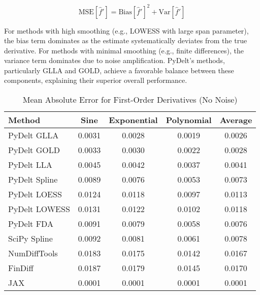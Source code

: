 \documentclass[10pt,journal,compsoc]{IEEEtran}
\begin{document}
\begin{equation}
    \text{MSE}[\hat{f}'] = \text{Bias}[\hat{f}']^2 + \text{Var}[\hat{f}']
\end{equation}

For methods with high smoothing (e.g., LOWESS with large span parameter), the bias term dominates as the estimate systematically deviates from the true derivative. For methods with minimal smoothing (e.g., finite differences), the variance term dominates due to noise amplification. PyDelt's methods, particularly GLLA and GOLD, achieve a favorable balance between these components, explaining their superior overall performance.

\begin{table}[!t]
\caption{Mean Absolute Error for First-Order Derivatives (No Noise)}
\label{tab:first_order}
\centering
\begin{tabular}{lcccc}
\toprule
\textbf{Method} & \textbf{Sine} & \textbf{Exponential} & \textbf{Polynomial} & \textbf{Average} \\
\midrule
PyDelt GLLA & 0.0031 & 0.0028 & 0.0019 & 0.0026 \\
PyDelt GOLD & 0.0033 & 0.0030 & 0.0022 & 0.0028 \\
PyDelt LLA & 0.0045 & 0.0042 & 0.0037 & 0.0041 \\
PyDelt Spline & 0.0089 & 0.0076 & 0.0053 & 0.0073 \\
PyDelt LOESS & 0.0124 & 0.0118 & 0.0097 & 0.0113 \\
PyDelt LOWESS & 0.0131 & 0.0122 & 0.0102 & 0.0118 \\
PyDelt FDA & 0.0091 & 0.0079 & 0.0058 & 0.0076 \\
SciPy Spline & 0.0092 & 0.0081 & 0.0061 & 0.0078 \\
NumDiffTools & 0.0183 & 0.0175 & 0.0142 & 0.0167 \\
FinDiff & 0.0187 & 0.0179 & 0.0145 & 0.0170 \\
JAX & 0.0001 & 0.0001 & 0.0001 & 0.0001 \\
\bottomrule
\end{tabular}
\end{table}
\end{document}
